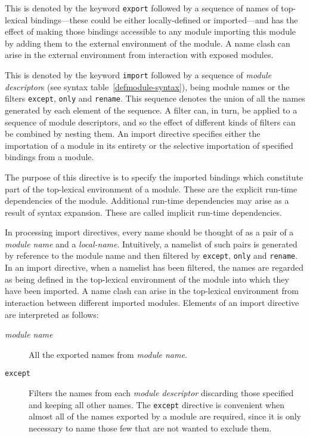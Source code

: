 %
%
\begin{optDefinition}
This is denoted by the keyword {\tt export} followed by a sequence of
names of top-lexical bindings---these could be either locally-defined or
imported---and has the effect of making those bindings accessible to any module
importing this module by adding them to the external environment of the module.
A name clash can arise in the external environment from interaction with exposed
modules.
\end{optDefinition}
%
%
\label{import}
%
\begin{optDefinition}
This is denoted by the keyword {\tt import} followed by a sequence of {\em
    module descriptor}s (see syntax table~\ref{defmodule-syntax}), being module
names or the filters {\tt except}, {\tt only} and {\tt rename}.  This sequence
denotes the union of all the names generated by each element of the sequence.  A
filter can, in turn, be applied to a sequence of module descriptors, and so the
effect of different kinds of filters can be combined by nesting them.  An import
directive specifies either the importation of a module in its entirety or the
selective importation of specified bindings from a module.

The purpose of this directive is to specify the imported bindings which
constitute part of the top-lexical environment of a module.  These are the
explicit run-time dependencies of the module.  Additional run-time dependencies
may arise as a result of syntax expansion.  These are called implicit run-time
dependencies.

In processing import directives, every name should be thought of as a pair of a
{\em module name} and a {\em local-name}.  Intuitively, a namelist of such pairs
is generated by reference to the module name and then filtered by {\tt except},
{\tt only} and {\tt rename}.  In an import directive, when a namelist has been
filtered, the names are regarded as being defined in the top-lexical environment
of the module into which they have been imported.  A name clash can arise in the
top-lexical environment from interaction between different imported modules.
Elements of an import directive are interpreted as follows:
%
\begin{description}
    \item[{\em module name}] All the exported names from {\em module name}.

    \item[{\tt except}] Filters the names from each {\em module descriptor}
    discarding those specified and keeping all other names.  The {\tt except}
    directive is convenient when almost all of the names exported by a module
    are required, since it is only necessary to name those few that are not
    wanted to exclude them.


\end{description}
\end{optDefinition}
